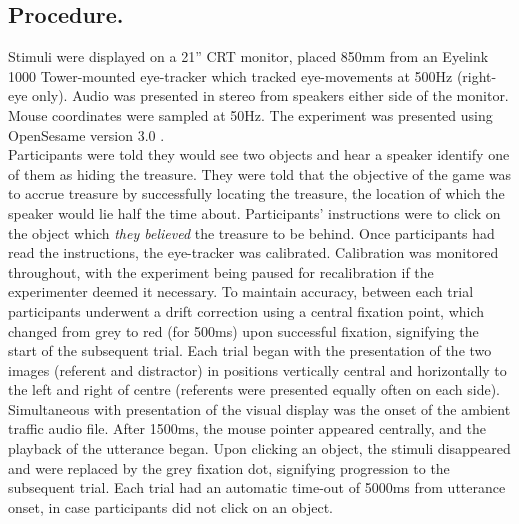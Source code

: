\documentclass[man]{apa6}
\begin{document}
\subsection{Procedure.}
Stimuli were displayed on a 21'' CRT monitor, placed 850mm from an Eyelink 1000 Tower-mounted eye-tracker which tracked eye-movements at 500Hz (right-eye only). 
Audio was presented in stereo from speakers either side of the monitor. 
Mouse coordinates were sampled at 50Hz. 
The experiment was presented using OpenSesame version 3.0 \citep{Mathot2012}.\\

Participants were told they would see two objects and hear a speaker identify one of them as hiding the treasure. 
They were told that the objective of the game was to accrue treasure by successfully locating the treasure, the location of which the speaker would lie half the time about. Participants' instructions were to click on the object which \textit{they believed} the treasure to be behind. 
Once participants had read the instructions, the eye-tracker was calibrated.
Calibration was monitored throughout, with the experiment being paused for recalibration if the experimenter deemed it necessary.
To maintain accuracy, between each trial participants underwent a drift correction using a central fixation point, which changed from grey to red (for 500ms) upon successful fixation, signifying the start of the subsequent trial. 
Each trial began with the presentation of the two images (referent and distractor) in positions vertically central and horizontally to the left and right of centre (referents were presented equally often on each side). 
Simultaneous with presentation of the visual display was the onset of the ambient traffic audio file. 
After 1500ms, the mouse pointer appeared centrally, and the playback of the utterance began. 
Upon clicking an object, the stimuli disappeared and were replaced by the grey fixation dot, signifying progression to the subsequent trial. 
Each trial had an automatic time-out of 5000ms from utterance onset, in case participants did not click on an object.\\
\end{document}
